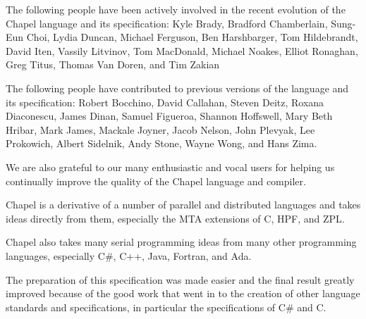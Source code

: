 \label{Acknowledgments}

The following people have been actively involved in the
recent evolution of the Chapel language and its specification:
Kyle Brady,
Bradford Chamberlain,
Sung-Eun Choi,
Lydia Duncan,
Michael Ferguson,
Ben Harshbarger,
Tom Hildebrandt,
David Iten,
Vassily Litvinov,
Tom MacDonald,
Michael Noakes,
Elliot Ronaghan,
Greg Titus,
Thomas Van Doren,
and Tim Zakian

The following people have contributed to previous versions
of the language and its specification:
Robert Bocchino,
David Callahan,
Steven Deitz,
Roxana Diaconescu,
James Dinan,
Samuel Figueroa,
Shannon Hoffswell,
Mary Beth Hribar,
Mark James,
Mackale Joyner,
Jacob Nelson,
John Plevyak,
Lee Prokowich,
Albert Sidelnik,
Andy Stone,
Wayne Wong,
and Hans Zima.

We are also grateful to our many enthusiastic and vocal users for
helping us continually improve the quality of the Chapel language and
compiler.

Chapel is a derivative of a number of parallel and distributed
languages and takes ideas directly from them, especially the MTA
extensions of C, HPF, and ZPL.

Chapel also takes many serial programming ideas from many other
programming languages, especially C\#, C++, Java, Fortran, and Ada.

The preparation of this specification was made easier and the final
result greatly improved because of the good work that went in to the
creation of other language standards and specifications, in particular
the specifications of C\# and C.
